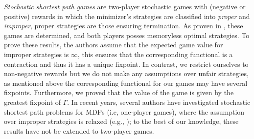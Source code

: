 

















	\emph{Stochastic shortest path games} \cite{PatekBertsekas99} are two-player stochastic games with (negative or positive) rewards in which the minimizer's strategies are classified into \emph{proper} and \emph{improper},
proper strategies are those ensuring termination.  As proven in \cite{PatekBertsekas99}, these games are determined, and both players posses memoryless optimal strategies.  To prove these results,  the authors assume that the expected game value for improper strategies is $\infty$, this ensures that the corresponding functional is a contraction and thus it has a unique fixpoint. In contrast, we restrict ourselves to non-negative rewards but we do not make any assumptions over unfair strategies, as mentioned above the corresponding functional for our games may have several fixpoints. Furthermore, we proved that the value of the game is given by the greatest fixpoint of $\Gamma$.  In recent years, several authors have investigated stochastic shortest path problems for MDPs (i.e,  one-player games), where the assumption over improper strategies  is relaxed (e.g., \cite{DBLP:conf/lics/Baier0DGS18}); to the best of our knowledge, these results have not be extended to two-player games.  

	

